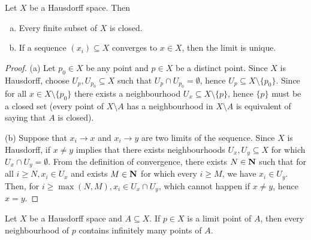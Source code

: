 \begin{proposition}
\label{prop: Hausdorff properties}
Let \(X\) be a Hausdorff space. Then
\begin{enumerate}[(a)]
  \item Every finite subset of \(X\) is closed.
  \item If a sequence \((x_i) \subseteq X\) converges to \(x \in X\), then the
    limit is unique.
\end{enumerate}
\end{proposition}

\begin{proof}
(a) Let \(p_0 \in X\) be any point and \(p \in X\) be a distinct point. Since
\(X\) is Hausdorff, choose \(U_p, U_{p_0} \subseteq X\) such that \(U_p \cap
U_{p_0} = \emptyset\), hence  \(U_p \subseteq X \setminus \{p_0\}\). Since for all
\(x \in X \setminus \{p_0\}\) there exists a neighbourhood \(U_x
\subseteq X \setminus \{p\}\), hence \(\{p\}\) must be a closed set (every
point of \(X \setminus A\) has a neighbourhood in \(X \setminus A\) is
equivalent of saying that \(A\) is closed).

(b) Suppose that \(x_i \to x\) and \(x_i \to y\) are two limits of the
sequence. Since \(X\) is Hausdorff, if \(x \neq y\) implies that there exists
neighbourhoods \(U_x, U_y \subseteq X\) for which \(U_x \cap U_y =
\emptyset\). From the definition of convergence, there exists \(N \in
\mathbf{N}\) such that for all \(i \geq N, x_i \in U_x\) and exists \(M \in \mathbf{N}\)
for which every \(i \geq M\), we have \(x_i \in U_y\). Then, for \(i \geq
\max(N, M), x_i \in U_x \cap U_y\), which cannot happen if \(x \neq y\), hence
\(x = y\).
\end{proof}

\begin{proposition}
\label{prop:nbhd-limit-pt}
Let \(X\) be a Hausdorff space and \(A \subseteq X\). If \(p \in X\) is a
limit point of \(A\), then every neighbourhood of \(p\) contains infinitely
many points of \(A\).
\end{proposition}

